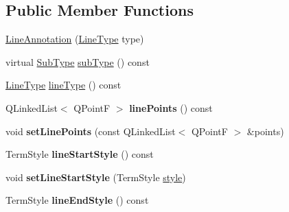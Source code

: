 \subsection*{Public Member Functions}
\begin{DoxyCompactItemize}
\item 
\hyperlink{class_poppler_1_1_line_annotation_a4d620567cdda702ef2d53099daf3660e}{Line\+Annotation} (\hyperlink{class_poppler_1_1_line_annotation_a0bcd4ea8f032803eb08e0411f78e0304}{Line\+Type} type)
\item 
virtual \hyperlink{class_poppler_1_1_annotation_a2d592999c330949d64679cfa9e81113f}{Sub\+Type} \hyperlink{class_poppler_1_1_line_annotation_aa6afc935d75cfdac20653814b0fe40f0}{sub\+Type} () const
\item 
\hyperlink{class_poppler_1_1_line_annotation_a0bcd4ea8f032803eb08e0411f78e0304}{Line\+Type} \hyperlink{class_poppler_1_1_line_annotation_af942cddff4c5cbaca75e5ef2fc323408}{line\+Type} () const
\item 
\mbox{\label{class_poppler_1_1_line_annotation_ac2a257c25e57c822666ef4f0e3153b69}} 
Q\+Linked\+List$<$ Q\+PointF $>$ {\bfseries line\+Points} () const
\item 
\mbox{\label{class_poppler_1_1_line_annotation_a538ceffa8d5c411af6866a8dd065a515}} 
void {\bfseries set\+Line\+Points} (const Q\+Linked\+List$<$ Q\+PointF $>$ \&points)
\item 
\mbox{\label{class_poppler_1_1_line_annotation_a494e200c7c99275d791fba411ddfa5b7}} 
Term\+Style {\bfseries line\+Start\+Style} () const
\item 
\mbox{\label{class_poppler_1_1_line_annotation_a17b92e338c62509eee826f6239e58f0e}} 
void {\bfseries set\+Line\+Start\+Style} (Term\+Style \hyperlink{class_poppler_1_1_annotation_a4857ee8533e1430f5776507f465040a8}{style})
\item 
\mbox{\label{class_poppler_1_1_line_annotation_af50cfc8bdc39fc42288ea94b70040858}} 
Term\+Style {\bfseries line\+End\+Style} () const
\item 
\mbox{\label{class_poppler_1_1_line_annotation_a9d4135cb9b40afbfee37062f77b2a932}} 

\end{DoxyCompactItemize}
